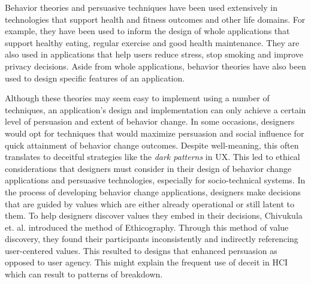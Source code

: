 Behavior theories and persuasive techniques have been used extensively in technologies that support health and fitness outcomes\cite{cowan2013apps,lister2014just} and other life domains\cite{michie2013behavior}. For example, they have been used to inform the design of whole applications that support healthy eating\cite{hsu2014persuasive,coughlin2015smartphone,okumus2016factors,lessel2016watercoaster,aydin2017save,reinhardt2019only}, regular exercise\cite{consolvo2006design,consolvo2008activity,consolvo2009goal,fritz2014persuasive,herrmanny2016using,de2016crowd} and good health maintenance\cite{purpura2011fit4life,stawarz2014don,orji2017towards}. They are also used in applications that help users reduce stress\cite{konrad2015finding,gimpel2015mystress}, stop smoking\cite{abroms2011iphone,heffner2015feature} and improve privacy decisions\cite{harbach2014using}. Aside from whole applications, behavior theories have also been used to design specific features of an application\cite{stawarz2014don,heffner2015feature}. 

Although these theories may seem easy to implement using a number of techniques, an application's design and implementation can only achieve a certain level of persuasion and extent of behavior change\cite{redstrom2006persuasive}. In some occasions, designers would opt for techniques that would maximize persuasion and social influence for quick attainment of behavior change outcomes. Despite well-meaning, this often translates to deceitful strategies like the \textit{dark patterns} in UX\cite{adar2013benevolent,gray2018dark}. This led to ethical considerations that designers must consider in their design of behavior change applications and persuasive technologies, especially for socio-technical systems. In the process of developing behavior change applications, designers make decisions that are guided by values which are either already operational or still latent to them. To help designers discover values they embed in their decisions, Chivukula et. al. introduced the method of Ethicography\cite{chivukula2019analyzing}. Through this method of value discovery, they found their participants inconsistently and indirectly referencing user-centered values. This resulted to designs that enhanced persuasion as opposed to user agency. This might explain the frequent use of deceit in HCI which can result to patterns of breakdown\cite{brynjarsdottir2012sustainably}. 

